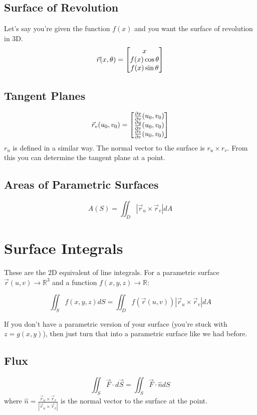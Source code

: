 \documentclass[a4paper,12pt]{report}
\begin{document}
\subsection{Surface of Revolution}
Let's say you're given the function $f(x)$ and you want the surface of revolution in 3D. 
$$
\vec{r}(x, \theta) = 
\begin{bmatrix}
x \\
f(x)\cos\theta \\
f(x)\sin\theta \notag
\end{bmatrix}
$$

\subsection{Tangent Planes}
$$\vec{r}_v(u_0, v_0) = 
\begin{bmatrix}
\frac{\partial x}{\partial v}(u_0, v_0) \\
\frac{\partial y}{\partial v}(u_0, v_0) \\
\frac{\partial z}{\partial v}(u_0, v_0) \notag
\end{bmatrix}
$$
$r_u$ is defined in a similar way. The normal vector to the surface is $r_u \times r_v$. From this you can determine the tangent plane at a point.

\subsection{Areas of Parametric Surfaces}
$$A(S) = \iint_D |\vec{r}_u \times \vec{r}_v| dA$$

\section{Surface Integrals}
These are the 2D equivalent of line integrals. For a parametric surface $\vec{r}(u, v) \to \mathbb{R}^3$ and a function $f(x, y, z) \to \mathbb{R}$:

$$\iint_S f(x, y, z) dS = \iint_D f(\vec{r}(u, v))|\vec{r}_u \times \vec{r}_v| dA$$

If you don't have a parametric version of your surface (you're stuck with $z = g(x, y)$), then just turn that into a parametric surface like we had before.

\subsection{Flux}
$$\iint_S \vec{F} \cdot d\vec{S} = \iint_S \vec{F} \cdot \hat{n} dS$$
where $\hat{n} = \frac{\vec{r}_u \times \vec{r}_v}{|\vec{r}_u \times \vec{r}_v|}$ is the normal vector to the surface at the point. 
\end{document}
